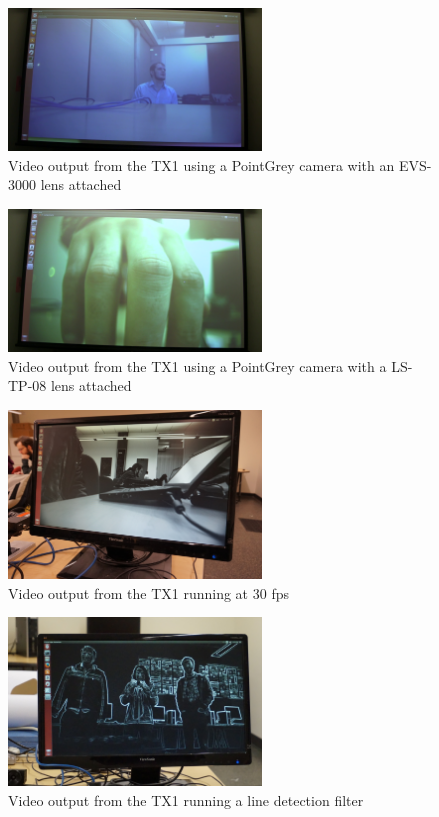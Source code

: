 \documentclass[letterpaper,10pt,titlepage]{IEEEtran}
\begin{document}
\begin{figure}[!ht]
  \caption{Video output from the TX1 using a PointGrey camera with an EVS-3000 lens attached}
	  \centering
		    \includegraphics[width=0.6\textwidth]{images/vlcsnap-2016-02-11-17h42m53s150.png}
				\end{figure}
\begin{figure}[!ht]
  \caption{Video output from the TX1 using a PointGrey camera with a LS-TP-08 lens attached}
	  \centering
		    \includegraphics[width=0.6\textwidth]{images/vlcsnap-2016-02-11-17h42m30s486.png}
				\end{figure}

\begin{figure}[!ht]
  \caption{Video output from the TX1 running at 30 fps}
	  \centering
		    \includegraphics[width=0.6\textwidth]{images/exampleOutputNormalBeta.jpg}
				\end{figure}
\begin{figure}[!ht]
  \caption{Video output from the TX1 running a line detection filter}
	  \centering
		    \includegraphics[width=0.6\textwidth]{images/exampleOutputLineDetectBeta.jpg}
				\end{figure}
  
\end{document}
